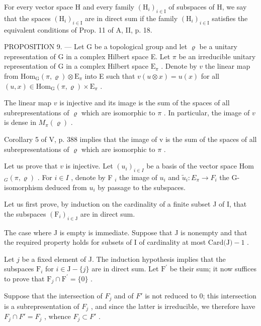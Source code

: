 For every vector space H and every family \((\mathrm{H}_{i})_{i\in\mathrm{I}}\) of subspaces of H, we say that the spaces \((\mathrm{H}_{i})_{i\in\mathrm{I}}\) are in direct sum if the family \((\mathrm{H}_{i})_{i\in\mathrm{I}}\) satisfies the equivalent conditions of Prop. 11 of A, II, p. 18.

PROPOSITION 9. --- Let G be a topological group and let \(\varrho\) be a unitary representation of G in a complex Hilbert space E. Let \(\pi\) be an irreducible unitary representation of G in a complex Hilbert space \(\mathrm{E}_{\pi}\) . Denote by \(v\) the linear map from \(\mathrm{Hom}_{\mathrm{G}}(\pi, \varrho) \otimes \mathrm{E}_{\pi}\) into E such that \(v(u \otimes x) = u(x)\) for all \((u, x) \in \mathrm{Hom}_{\mathrm{G}}(\pi, \varrho) \times \mathrm{E}_{\pi}\) .

The linear map \(v\) is injective and its image is the sum of the spaces of all subrepresentations of \(\varrho\) which are isomorphic to \(\pi\) . In particular, the image of \(v\) is dense in \(M_{\pi}(\varrho)\) .

Corollary 5 of V, p. 388 implies that the image of v is the sum of the spaces of all subrepresentations of \(\varrho\) which are isomorphic to \(\pi\) .

Let us prove that \(v\) is injective. Let \((u_i)_{i \in I}\) be a basis of the vector space Hom \(_G(\pi, \varrho)\) . For \(i \in I\) , denote by F \(_i\) the image of \(u_i\) and \(\widetilde{u}_i \colon E_\pi \to F_i\) the G-isomorphism deduced from \(u_i\) by passage to the subspaces.

Let us first prove, by induction on the cardinality of a finite subset J of I, that the subspaces \((\mathrm{F}_{i})_{i\in\mathrm{J}}\) are in direct sum.

The case where J is empty is immediate. Suppose that J is nonempty and that the required property holds for subsets of I of cardinality at most \(\text{Card(J)} - 1\) .

Let \(j\) be a fixed element of J. The induction hypothesis implies that the subspaces \(\mathrm{F}_{i}\) for \(i\in\mathrm{J}-\{j\}\) are in direct sum. Let \(\mathrm{F}^{\prime}\) be their sum; it now suffices to prove that \(\mathrm{F}_{j}\cap\mathrm{F}^{\prime}=\{0\}\) .

Suppose that the intersection of \(F_{j}\) and of \(F'\) is not reduced to 0; this intersection is a subrepresentation of \(F_{j}\) , and since the latter is irreducible, we therefore have \(F_{j} \cap F' = F_{j}\) , whence \(F_{j} \subset F'\) .

